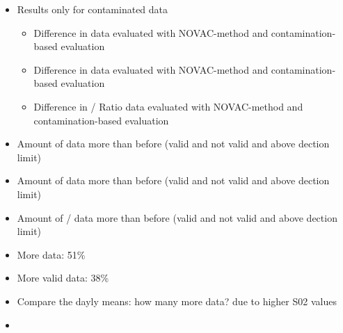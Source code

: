 \documentclass  [
  paper    = a4,
  BCOR     = 10mm,
  twoside,
  fontsize = 12pt,
  fleqn,
  toc      = bibnumbered,
  toc      = listofnumbered,
  numbers  = noendperiod,
  headings = normal,
  listof   = leveldown,
  version  = 3.03
]                                       {scrreprt}
\begin{document}
	\begin{itemize}
		\item Results only for contaminated data
		\begin{itemize}
			\item Difference in  data evaluated with NOVAC-method and contamination-based evaluation
			\item Difference in  data evaluated with NOVAC-method and contamination-based evaluation
			\item Difference in / Ratio data evaluated with NOVAC-method and contamination-based evaluation
		\end{itemize}
		\item Amount of  data more than before (valid and not valid and above dection limit)
		\item Amount of  data more than before (valid and not valid and above dection limit)
		\item Amount of / data more than before (valid and not valid and above dection limit)
		\item More  data: 51\%
		\item  More valid  data: 38\%
		\item Compare the dayly means: how many more data? due to higher S02 values
		\item 
	\end{itemize}
\end{document}
